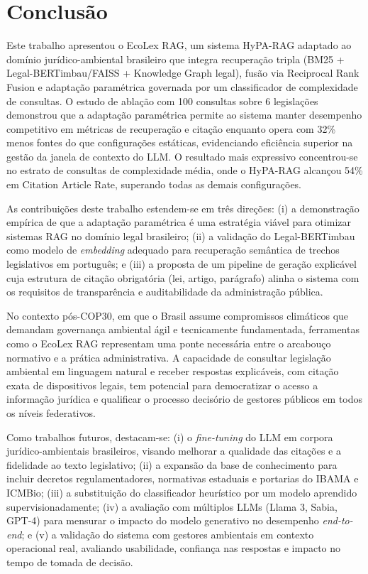 \documentclass[12pt]{article}
\begin{document}
\section{Conclusão}

Este trabalho apresentou o EcoLex RAG, um sistema HyPA-RAG adaptado ao domínio jurídico-ambiental brasileiro que integra recuperação tripla (BM25 + Legal-BERTimbau/FAISS + Knowledge Graph legal), fusão via Reciprocal Rank Fusion e adaptação paramétrica governada por um classificador de complexidade de consultas. O estudo de ablação com 100 consultas sobre 6 legislações demonstrou que a adaptação paramétrica permite ao sistema manter desempenho competitivo em métricas de recuperação e citação enquanto opera com 32\% menos fontes do que configurações estáticas, evidenciando eficiência superior na gestão da janela de contexto do LLM. O resultado mais expressivo concentrou-se no estrato de consultas de complexidade média, onde o HyPA-RAG alcançou 54\% em Citation Article Rate, superando todas as demais configurações.

As contribuições deste trabalho estendem-se em três direções: (i) a demonstração empírica de que a adaptação paramétrica é uma estratégia viável para otimizar sistemas RAG no domínio legal brasileiro; (ii) a validação do Legal-BERTimbau como modelo de \textit{embedding} adequado para recuperação semântica de trechos legislativos em português; e (iii) a proposta de um pipeline de geração explicável cuja estrutura de citação obrigatória (lei, artigo, parágrafo) alinha o sistema com os requisitos de transparência e auditabilidade da administração pública.

No contexto pós-COP30, em que o Brasil assume compromissos climáticos que demandam governança ambiental ágil e tecnicamente fundamentada, ferramentas como o EcoLex RAG representam uma ponte necessária entre o arcabouço normativo e a prática administrativa. A capacidade de consultar legislação ambiental em linguagem natural e receber respostas explicáveis, com citação exata de dispositivos legais, tem potencial para democratizar o acesso a informação jurídica e qualificar o processo decisório de gestores públicos em todos os níveis federativos.

Como trabalhos futuros, destacam-se: (i) o \textit{fine-tuning} do LLM em corpora jurídico-ambientais brasileiros, visando melhorar a qualidade das citações e a fidelidade ao texto legislativo; (ii) a expansão da base de conhecimento para incluir decretos regulamentadores, normativas estaduais e portarias do IBAMA e ICMBio; (iii) a substituição do classificador heurístico por um modelo aprendido supervisionadamente; (iv) a avaliação com múltiplos LLMs (Llama 3, Sabia, GPT-4) para mensurar o impacto do modelo generativo no desempenho \textit{end-to-end}; e (v) a validação do sistema com gestores ambientais em contexto operacional real, avaliando usabilidade, confiança nas respostas e impacto no tempo de tomada de decisão.



\end{document}
